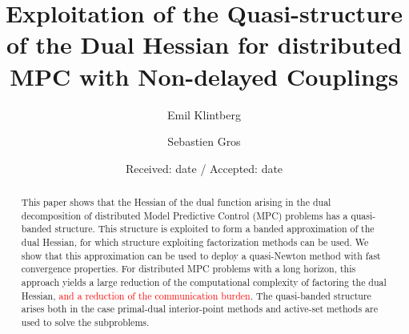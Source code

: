 \title{Exploitation of the Quasi-structure of the Dual Hessian for distributed MPC with Non-delayed Couplings%
}


\author{Emil Klintberg         \and
        Sebastien Gros %
}



\date{Received: date / Accepted: date}


\maketitle

\begin{abstract}
This paper shows that the Hessian of the dual function arising in the dual decomposition of distributed Model Predictive Control (MPC) problems has a quasi-banded structure. This structure is exploited to form a banded approximation of the dual Hessian, for which structure exploiting factorization methods can be used. We show that this approximation can be used to deploy a quasi-Newton method with fast convergence properties. For distributed MPC problems with a long horizon, this approach yields a large reduction of the computational complexity of factoring the dual Hessian, \textcolor{red}{and a reduction of the communication burden}. The quasi-banded structure arises both in the case primal-dual interior-point methods and active-set methods are used to solve the subproblems.
\end{abstract}

